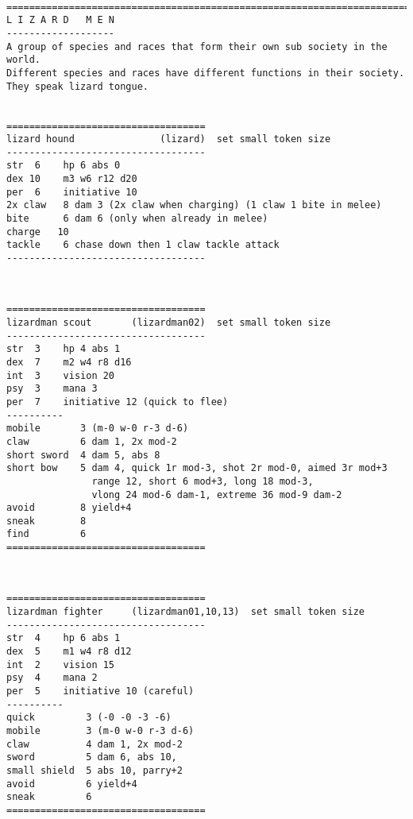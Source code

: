 \







\pagebreak[1]
 {}
\tiny \begin{samepage} \begin{verbatim}
================================================================================
L I Z A R D   M E N
-------------------
A group of species and races that form their own sub society in the world.
Different species and races have different functions in their society.
They speak lizard tongue.


===================================
lizard hound               (lizard)  set small token size
-----------------------------------
str  6    hp 6 abs 0
dex 10    m3 w6 r12 d20
per  6    initiative 10
2x claw   8 dam 3 (2x claw when charging) (1 claw 1 bite in melee)
bite      6 dam 6 (only when already in melee)
charge   10
tackle    6 chase down then 1 claw tackle attack
-----------------------------------
\end{verbatim} \end{samepage} \normalsize

\

\pagebreak[1]
\tiny \begin{samepage} \begin{verbatim}
===================================
lizardman scout       (lizardman02)  set small token size
-----------------------------------
str  3    hp 4 abs 1
dex  7    m2 w4 r8 d16
int  3    vision 20
psy  3    mana 3
per  7    initiative 12 (quick to flee)
----------
mobile       3 (m-0 w-0 r-3 d-6)
claw         6 dam 1, 2x mod-2
short sword  4 dam 5, abs 8
short bow    5 dam 4, quick 1r mod-3, shot 2r mod-0, aimed 3r mod+3
               range 12, short 6 mod+3, long 18 mod-3,
               vlong 24 mod-6 dam-1, extreme 36 mod-9 dam-2
avoid        8 yield+4
sneak        8
find         6
===================================
\end{verbatim} \end{samepage} \normalsize

\

\pagebreak[1]
\tiny \begin{samepage} \begin{verbatim}
===================================
lizardman fighter     (lizardman01,10,13)  set small token size
-----------------------------------
str  4    hp 6 abs 1
dex  5    m1 w4 r8 d12
int  2    vision 15
psy  4    mana 2
per  5    initiative 10 (careful)
----------
quick         3 (-0 -0 -3 -6)
mobile        3 (m-0 w-0 r-3 d-6)
claw          4 dam 1, 2x mod-2
sword         5 dam 6, abs 10,
small shield  5 abs 10, parry+2
avoid         6 yield+4
sneak         6
===================================
\end{verbatim} \end{samepage} \normalsize

